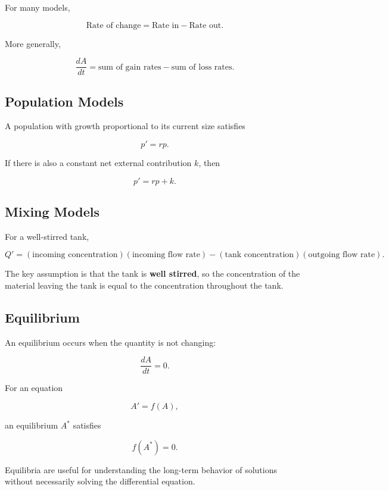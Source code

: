 \documentclass[11pt]{article}
\begin{document}
For many models,

\[
\boxed{
\text{Rate of change}
=
\text{Rate in}
-
\text{Rate out}.
}
\]

More generally,

\[
\boxed{
\frac{dA}{dt}
=
\text{sum of gain rates}
-
\text{sum of loss rates}.
}
\]

\subsection{Population Models}

A population with growth proportional to its current size satisfies

\[
\boxed{
p'=rp.
}
\]

If there is also a constant net external contribution \(k\), then

\[
\boxed{
p'=rp+k.
}
\]

\subsection{Mixing Models}

For a well-stirred tank,

\[
\boxed{
Q'
=
(\text{incoming concentration})
(\text{incoming flow rate})
-
(\text{tank concentration})
(\text{outgoing flow rate}).
}
\]

The key assumption is that the tank is \textbf{well stirred}, so the
concentration of the material leaving the tank is equal to the
concentration throughout the tank.

\subsection{Equilibrium}

An equilibrium occurs when the quantity is not changing:

\[
\boxed{
\frac{dA}{dt}=0.
}
\]

For an equation

\[
A'=f(A),
\]

an equilibrium \(A^*\) satisfies

\[
\boxed{
f(A^*)=0.
}
\]

Equilibria are useful for understanding the long-term behavior of
solutions without necessarily solving the differential equation.
\end{document}
